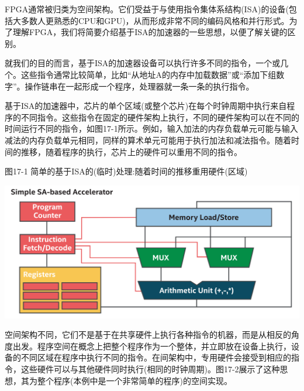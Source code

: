 FPGA通常被归类为空间架构。它们受益于与使用指令集体系结构(ISA)的设备(包括大多数人更熟悉的CPU和GPU)，从而形成非常不同的编码风格和并行形式。为了理解FPGA，我们将简要介绍基于ISA的加速器的一些思想，以便了解关键的区别。\par

就我们的目的而言，基于ISA的加速器设备可以执行许多不同的指令，一个或几个。这些指令通常比较简单，比如“从地址A的内存中加载数据”或“添加下组数字”。操作链串在一起形成一个程序，处理器就一条一条的执行指令。\par

基于ISA的加速器中，芯片的单个区域(或整个芯片)在每个时钟周期中执行来自程序的不同指令。这些指令在固定的硬件架构上执行，不同的硬件架构可以在不同的时间运行不同的指令，如图17-1所示。例如，输入加法的内存负载单元可能与输入减法的内存负载单元相同，同样的算术单元可能用于执行加法和减法指令。随着时间的推移，随着程序的执行，芯片上的硬件可以重用不同的指令。\par

\hspace*{\fill} \par %
图17-1 简单的基于ISA的(临时)处理:随着时间的推移重用硬件(区域)
\begin{center}
	\includegraphics[width=1.0\textwidth]{content/chapter-17/images/2}
\end{center}

空间架构不同，它们不是基于在共享硬件上执行各种指令的机器，而是从相反的角度出发。程序空间在概念上把整个程序作为一个整体，并立即放在设备上执行，设备的不同区域在程序中执行不同的指令。在间架构中，专用硬件会接受到相应的指令，这些硬件可以与其他硬件同时执行(相同的时钟周期)。图17-2展示了这种思想，其为整个程序(本例中是一个非常简单的程序)的空间实现。\par

